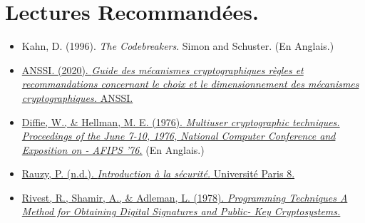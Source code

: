 \documentclass{article}
\begin{document}
\section{Lectures Recommandées.}

\begin{itemize}
	\item 
	Kahn, D. (1996). \textit{The Codebreakers}. Simon and Schuster. (En Anglais.)
	\item
	\href{https://cyber.gouv.fr/sites/default/files/2021/03/anssi-guide-mecanismes_crypto-2.04.pdf}{ANSSI. (2020). \textit{Guide des mécanismes cryptographiques règles et recommandations concernant le choix et le dimensionnement des mécanismes cryptographiques.} ANSSI.}
	\item
	\href{https://doi.org/10.1145/1499799.1499815}{Diffie, W., \& Hellman, M. E. (1976). \textit{Multiuser cryptographic techniques. Proceedings of the June 7-10, 1976, National Computer Conference and Exposition on - AFIPS ’76.}} (En Anglais.)
	\item 
	\href{https://pablo.rauzy.name/teaching/is/07-cryptanalyse.pdf}{Rauzy, P. (n.d.). \textit{Introduction à la sécurité.} Université Paris 8.}
	\item 
	\href{https://people.csail.mit.edu/rivest/pubs/RSA78.pdf}{Rivest, R., Shamir, A., \& Adleman, L. (1978). \textit{Programming Techniques A Method for Obtaining Digital Signatures and Public- Key Cryptosystems.}}
\end{itemize}
\end{document}
